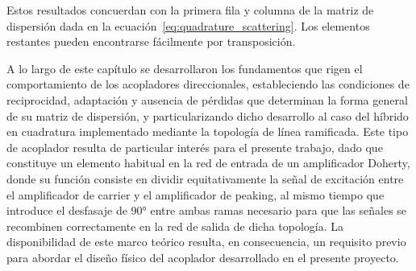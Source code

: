 Estos resultados concuerdan con la primera fila y columna de la matriz de dispersión dada en la ecuación~\eqref{eq:quadrature_scattering}. Los elementos restantes pueden encontrarse fácilmente por transposición.

A lo largo de este capítulo se desarrollaron los fundamentos que rigen el comportamiento de los acopladores direccionales, estableciendo las condiciones de reciprocidad, adaptación y ausencia de pérdidas que determinan la forma general de su matriz de dispersión, y particularizando dicho desarrollo al caso del híbrido en cuadratura implementado mediante la topología de línea ramificada. Este tipo de acoplador resulta de particular interés para el presente trabajo, dado que constituye un elemento habitual en la red de entrada de un amplificador Doherty, donde su función consiste en dividir equitativamente la señal de excitación entre el amplificador de carrier y el amplificador de peaking, al mismo tiempo que introduce el desfasaje de 90° entre ambas ramas necesario para que las señales se recombinen correctamente en la red de salida de dicha topología. La disponibilidad de este marco teórico resulta, en consecuencia, un requisito previo para abordar el diseño físico del acoplador desarrollado en el presente proyecto.